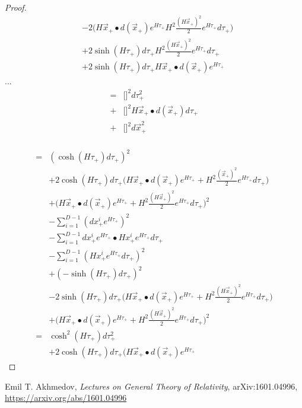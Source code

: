 \documentclass[]{article}
\begin{document}
\begin{proof}
\begin{align*}
	&-2\big(H\vec{x}_+\bullet d(\vec{x}_+)e^{H\tau_+} H^2\frac{(H\vec{x}_+)^2}{2}e^{H\tau_+}d\tau_+\big)\\
	&+2\sinh(H\tau_+)d\tau_+ H^2\frac{(H\vec{x}_+)^2}{2}e^{H\tau_+}d\tau_+\\
	&+2\sinh(H\tau_+)d\tau_+ H\vec{x}_+\bullet d(\vec{x}_+)e^{H\tau_+} 	
	\end{align*}
	...
	\begin{align*}
	=&\big[\big]^2 d\tau_+^2\\
	+&\big[\big]^2H\vec{x}_+\bullet d(\vec{x}_+)d\tau_+\\
	+&\big[\big]^2d\vec{x}^2_+
	\end{align*}
	
	\begin{align*}
	\\
	=& (\cosh(H\tau_+)d\tau_+)^2 \\
	&+ 2 \cosh(H\tau_+)d\tau_+ \big(H\vec{x}_+\bullet d(\vec{x}_+)e^{H\tau_+}+H^2\frac{(\vec{x}_+)^2}{2}e^{H\tau_+}d\tau_+\big)\\ &+\big(H\vec{x}_+\bullet d(\vec{x}_+)e^{H\tau_+} +H^2\frac{(H\vec{x}_+)^2}{2}e^{H\tau_+}d\tau_+\big)^2\\
	&- \sum_{i=1}^{D-1}(dx^i_+e^{H\tau_+})^2\\
	&- \sum_{i=1}^{D-1}dx^i_+e^{H\tau_+} \bullet H x^i_+e^{H\tau_+}d\tau_+\\
	&- \sum_{i=1}^{D-1}(H x^i_+e^{H\tau_+}d\tau_+)^2\\
	&+ (-\sinh(H\tau_+)d\tau_+ )^2\\
	&- 2 \sinh(H\tau_+)d\tau_+ \big(H\vec{x}_+\bullet d(\vec{x}_+)e^{H\tau_+} +H^2\frac{(H\vec{x}_+)^2}{2}e^{H\tau_+}d\tau_+\big) \\
	&+ \big(H\vec{x}_+\bullet d(\vec{x}_+)e^{H\tau_+} +H^2\frac{(H\vec{x}_+)^2}{2}e^{H\tau_+}d\tau_+\big)^2\\
	=& \cosh^2(H\tau_+)d\tau_+^2\\
	&+2 \cosh(H\tau_+)d\tau_+ \big(H\vec{x}_+\bullet d(\vec{x}_+)e^{H\tau_+}
	\end{align*}
\end{proof}
\begin{thebibliography}{9}\label{section:biblio}
	\raggedright
	Emil T. Akhmedov,
	\emph{Lectures on General Theory of Relativity},
	arXiv:1601.04996,
	\url{https://arxiv.org/abs/1601.04996}
\end{thebibliography}
\end{document}
